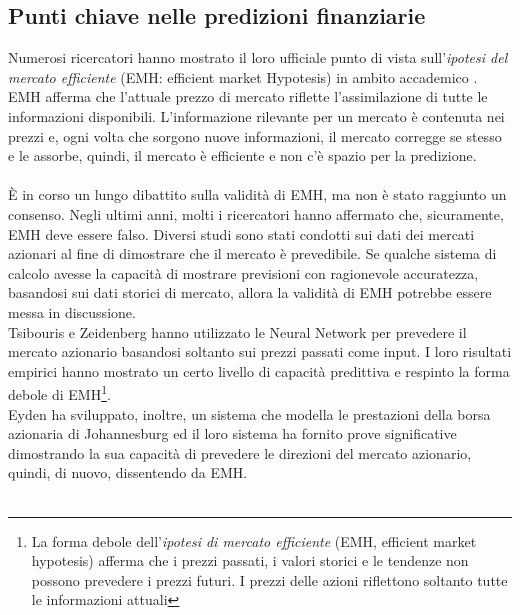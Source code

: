 \documentclass[a4paper,12pt]{report}
\begin{document}
\subsection{Punti chiave nelle predizioni finanziarie}
Numerosi ricercatori hanno mostrato il loro ufficiale punto di vista sull'\textit{ipotesi del mercato efficiente} (EMH: efficient market Hypotesis) in ambito accademico \cite{emh1}\cite{emh2}. EMH afferma che l'attuale prezzo di mercato riflette l'assimilazione di tutte le informazioni disponibili\cite{emh3}. L'informazione rilevante per un mercato è contenuta nei prezzi e, ogni volta che sorgono nuove informazioni, il mercato corregge se stesso e le assorbe, quindi, il mercato è efficiente e non c'è spazio per la predizione\cite{emh4}.\\~\\
È in corso un lungo dibattito sulla validità di EMH, ma non è stato raggiunto un consenso. Negli ultimi anni, molti i ricercatori hanno affermato che, sicuramente, EMH deve essere falso\cite{emh4}. Diversi studi sono stati condotti sui dati dei mercati azionari al fine di dimostrare che il mercato è prevedibile. Se qualche sistema di calcolo avesse la capacità di mostrare previsioni con ragionevole accuratezza, basandosi sui dati storici di mercato, allora la validità di EMH potrebbe essere messa in discussione.\\
Tsibouris e Zeidenberg\cite{emh0} hanno utilizzato le Neural Network per prevedere il mercato azionario basandosi soltanto sui prezzi passati come input. I loro risultati empirici hanno mostrato un certo livello di capacità predittiva e respinto la forma debole di EMH\footnote{La forma debole dell'\textit{ipotesi di mercato efficiente} (EMH, efficient market hypotesis) afferma che i prezzi passati, i valori storici e le tendenze non possono prevedere i prezzi futuri. I prezzi delle azioni riflettono soltanto tutte le informazioni attuali}.\\
Eyden \cite{nn-eyden} ha sviluppato, inoltre, un sistema che modella le prestazioni della borsa azionaria di Johannesburg ed il loro sistema ha fornito prove significative dimostrando la sua capacità di prevedere le direzioni del mercato azionario, quindi, di nuovo, dissentendo da EMH.\\~\\
\end{document}
